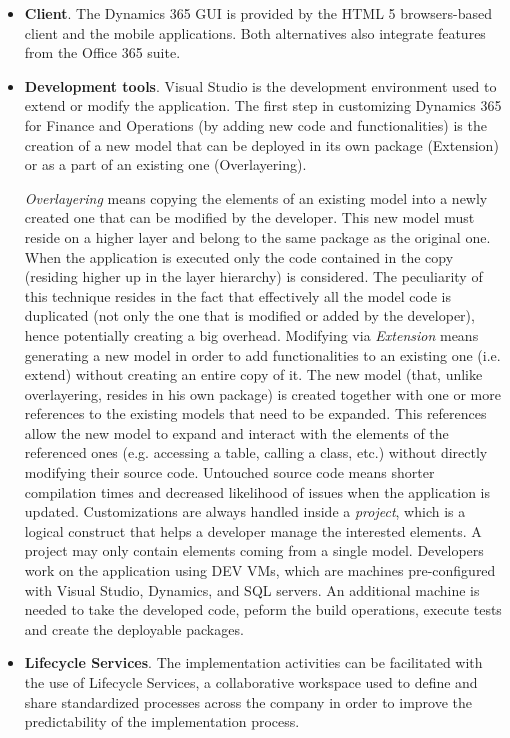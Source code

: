 \begin{itemize}
    \item \textbf{Client}. The Dynamics 365 GUI is provided by the HTML 5 browsers-based client and the mobile applications. Both alternatives also integrate features from the Office 365 suite.
    
    \item \textbf{Development tools}. Visual Studio is the development environment used to extend or modify the application. The first step in customizing Dynamics 365 for Finance and Operations (by adding new code and functionalities) is the creation of a new model that can be deployed in its own package (Extension) or as a part of an existing one (Overlayering).
    
    \textit{Overlayering} means copying the elements of an existing model into a newly created one that can be modified by the developer. This new model must reside on a higher layer and belong to the same package as the original one. When the application is executed only the code contained in the copy (residing higher up in the layer hierarchy) is considered. The peculiarity of this technique resides in the fact that effectively all the model code is duplicated (not only the one that is modified or added by the developer), hence potentially creating a big overhead. Modifying via \textit{Extension} means generating a new model in order to add functionalities to an existing one (i.e. extend) without creating an entire copy of it. The new model (that, unlike overlayering, resides in his own package) is created together with one or more references to the existing models that need to be expanded. This references allow the new model to expand and interact with the elements of the referenced ones (e.g. accessing a table, calling a class, etc.) without directly modifying their source code. Untouched source code means shorter compilation times and decreased likelihood of issues when the application is updated. Customizations are always handled inside a \textit{project}, which is a logical construct that helps a developer manage the interested elements. A project may only contain elements coming from a single model. Developers work on the application using DEV VMs, which are machines pre-configured with Visual Studio, Dynamics, and SQL servers. An additional machine is needed to take the developed code, peform the build operations, execute tests and create the deployable packages.
    
    \item \textbf{Lifecycle Services}. The implementation activities can be facilitated with the use of Lifecycle Services, a collaborative workspace used to define and share standardized processes across the company in order to improve the predictability of the implementation process.
\end{itemize}

